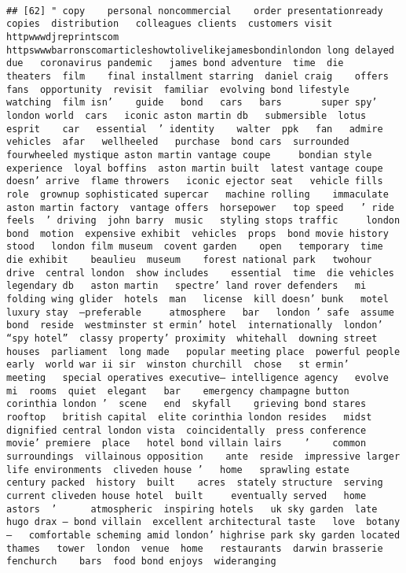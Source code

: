 \documentclass[
]{article}
\begin{document}
\begin{verbatim}
                                                                                                                                                                                                                                                                                                                                                                                                                                                                   
## [62] " copy    personal noncommercial    order presentationready copies  distribution   colleagues clients  customers visit httpwwwdjreprintscom httpswwwbarronscomarticleshowtolivelikejamesbondinlondon long delayed due   coronavirus pandemic   james bond adventure  time  die     theaters  film    final installment starring  daniel craig    offers fans  opportunity  revisit  familiar  evolving bond lifestyle   watching  film isn’    guide   bond   cars   bars       super spy’ london world  cars   iconic aston martin db   submersible  lotus esprit    car   essential  ’ identity    walter  ppk   fan   admire  vehicles  afar   wellheeled   purchase  bond cars  surrounded  fourwheeled mystique aston martin vantage coupe     bondian style   experience  loyal boffins  aston martin built  latest vantage coupe  doesn’ arrive  flame throwers   iconic ejector seat   vehicle fills  role  grownup sophisticated supercar   machine rolling    immaculate aston martin factory  vantage offers  horsepower   top speed   ’ ride feels  ’ driving  john barry  music   styling stops traffic     london bond  motion  expensive exhibit  vehicles  props  bond movie history  stood   london film museum  covent garden    open   temporary  time  die exhibit    beaulieu  museum    forest national park   twohour drive  central london  show includes    essential  time  die vehicles   legendary db   aston martin   spectre’ land rover defenders   mi folding wing glider  hotels  man   license  kill doesn’ bunk   motel    luxury stay  —preferable     atmosphere   bar   london ’ safe  assume bond  reside  westminster st ermin’ hotel  internationally  london’ “spy hotel”  classy property’ proximity  whitehall  downing street   houses  parliament  long made   popular meeting place  powerful people early  world war ii sir  winston churchill  chose   st ermin’     meeting   special operatives executive— intelligence agency   evolve  mi  rooms  quiet  elegant   bar    emergency champagne button   corinthia london ’  scene   end  skyfall    grieving bond stares    rooftop   british capital  elite corinthia london resides   midst   dignified central london vista  coincidentally  press conference   movie’ premiere  place   hotel bond villain lairs    ’    common surroundings  villainous opposition    ante  reside  impressive larger  life environments  cliveden house ’   home   sprawling estate    century packed  history  built    acres  stately structure  serving   current cliveden house hotel  built     eventually served   home    astors  ’      atmospheric  inspiring hotels   uk sky garden  late  hugo drax — bond villain  excellent architectural taste   love  botany—   comfortable scheming amid london’ highrise park sky garden located   thames   tower  london  venue  home   restaurants  darwin brasserie    fenchurch    bars  food bond enjoys  wideranging 
\end{verbatim}
\end{document}
